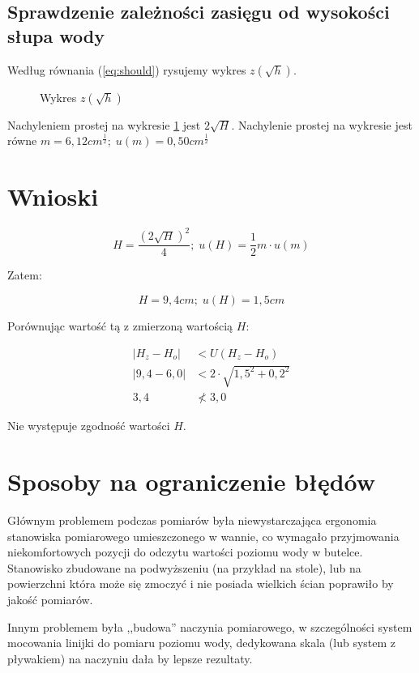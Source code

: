 \documentclass[a4paper,12pt]{article}
\begin{document}
\subsection*{Sprawdzenie zależności zasięgu od wysokości słupa wody}

Według równania (\ref{eq:should}) rysujemy wykres $z\left( \sqrt{h} \right)$.

\begin{figure}[h]
	
	\centering
	\caption{Wykres $z\left(\sqrt{h}\right)$}\label{wyk:pierH}
\end{figure}

Nachyleniem prostej na wykresie \ref{wyk:pierH} jest $2\sqrt{H}$. Nachylenie prostej na wykresie jest równe $m = 6,12 cm^{\frac{1}{2}};\; u\left(m\right) = 0,50 cm^{\frac{1}{2}}$

\section{Wnioski}

\[H = \frac{\left(2 \sqrt{H}\right)^2}{4};\; u\left(H\right) = \frac{1}{2} m \cdot u\left(m\right)\]

Zatem:

\[H = 9,4 cm;\; u\left(H\right) = 1,5 cm\]

Porównując wartość tą z zmierzoną wartością $H$:

\begin{align*}
	\left| H_z - H_o \right| &< U\left(H_z - H_o\right) \\
	\left| 9,4 - 6,0 \right| &< 2 \cdot \sqrt{1,5^2 + 0,2^2} \\
	3,4 &\not< 3,0
\end{align*}

Nie występuje zgodność wartości $H$.

\section{Sposoby na ograniczenie błędów}

Głównym problemem podczas pomiarów była niewystarczająca ergonomia stanowiska pomiarowego umieszczonego w wannie, co wymagało przyjmowania niekomfortowych pozycji do odczytu wartości poziomu wody w butelce. Stanowisko zbudowane na podwyższeniu (na przykład na stole), lub na powierzchni która może się zmoczyć i nie posiada wielkich ścian poprawiło by jakość pomiarów.

Innym problemem była ,,budowa'' naczynia pomiarowego, w szczególności system mocowania linijki do pomiaru poziomu wody, dedykowana skala (lub system z pływakiem) na naczyniu dała by lepsze rezultaty.
\end{document}
